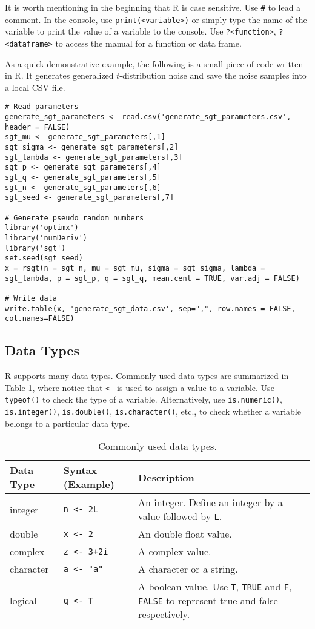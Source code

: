 It is worth mentioning in the beginning that R is case sensitive. Use \verb|#| to lead a comment. In the console, use \verb|print(<variable>)| or simply type the name of the variable to print the value of a variable to the console. Use \verb|?<function>|, \verb|?<dataframe>| to access the manual for a function or data frame.

As a quick demonstrative example, the following is a small piece of code written in R. It generates generalized $t$-distribution noise and save the noise samples into a local CSV file.
\begin{lstlisting}
# Read parameters
generate_sgt_parameters <- read.csv('generate_sgt_parameters.csv', header = FALSE)
sgt_mu <- generate_sgt_parameters[,1]
sgt_sigma <- generate_sgt_parameters[,2]
sgt_lambda <- generate_sgt_parameters[,3]
sgt_p <- generate_sgt_parameters[,4]
sgt_q <- generate_sgt_parameters[,5]
sgt_n <- generate_sgt_parameters[,6]
sgt_seed <- generate_sgt_parameters[,7]

# Generate pseudo random numbers
library('optimx')
library('numDeriv')
library('sgt')
set.seed(sgt_seed)
x = rsgt(n = sgt_n, mu = sgt_mu, sigma = sgt_sigma, lambda = sgt_lambda, p = sgt_p, q = sgt_q, mean.cent = TRUE, var.adj = FALSE)

# Write data
write.table(x, 'generate_sgt_data.csv', sep=",", row.names = FALSE, col.names=FALSE)
\end{lstlisting}

\subsection{Data Types}

R supports many data types. Commonly used data types are summarized in Table \ref{ch:r1:tab:datatype}, where notice that \verb|<-| is used to assign a value to a variable. Use \verb|typeof()| to check the type of a variable. Alternatively, use \verb|is.numeric()|, \verb|is.integer()|, \verb|is.double()|, \verb|is.character()|, etc., to check whether a variable belongs to a particular data type.
\begin{table}
  \centering \caption{Commonly used data types.}\label{ch:r1:tab:datatype}
  \begin{tabularx}{\textwidth}{llX}
    \hline
    Data Type & Syntax (Example) & Description \\ \hline
    integer & \verb|n <- 2L| & An integer. Define an integer by a value followed by \verb|L|. \\
    double & \verb|x <- 2| & An double float value. \\
    complex & \verb|z <- 3+2i| & A complex value. \\
    character & \verb|a <- "a"| & A character or a string. \\
    logical & \verb|q <- T| & A boolean value. Use \verb|T|, \verb|TRUE| and \verb|F|, \verb|FALSE| to represent true and false respectively. \\
    \hline
  \end{tabularx}
\end{table}

